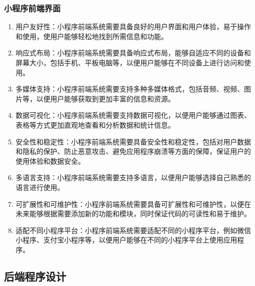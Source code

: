 \documentclass[UTF8]{ctexart}
\newcommand{\m}[1]{\textcolor{modify}{#1}}
\begin{document}
    \subsubsection{小程序前端界面}
    \m{
        \begin{enumerate}
            \item 用户友好性：小程序前端系统需要具备良好的用户界面和用户体验，易于操作和使用，使用户能够轻松地找到所需信息和功能。
            \item 响应式布局：小程序前端系统需要具备响应式布局，能够自适应不同的设备和屏幕大小，包括手机、平板电脑等，以便用户能够在不同设备上进行访问和使用。
            \item 多媒体支持：小程序前端系统需要支持多种多媒体格式，包括音频、视频、图片等，以便用户能够获取到更加丰富的信息和资源。
            \item 数据可视化：小程序前端系统需要支持数据可视化，以便用户能够通过图表、表格等方式更加直观地查看和分析数据和统计信息。
            \item 安全性和稳定性：小程序前端系统需要具备安全性和稳定性，包括对用户数据和隐私的保护、防止恶意攻击、避免应用程序崩溃等方面的保障，保证用户的使用体验和数据安全。
            \item 多语言支持：小程序前端系统需要支持多语言，以便用户能够选择自己熟悉的语言进行使用。
            \item 可扩展性和可维护性：小程序前端系统需要具备可扩展性和可维护性，以便在未来能够根据需要添加新的功能和模块，同时保证代码的可读性和易于维护。
            \item 适配不同小程序平台：小程序前端系统需要适配不同的小程序平台，例如微信小程序、支付宝小程序等，以便用户能够在不同的小程序平台上使用应用程序。
            \end{enumerate}
    }

    \subsection{后端程序设计}
\end{document}
